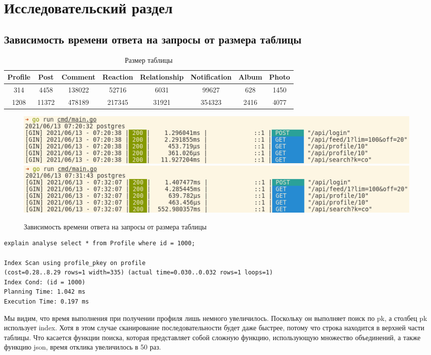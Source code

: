 \chapter{Исследовательский раздел}
\label{cha:research}

\section{Зависимость времени ответа на запросы от размера таблицы}

\setlength\tabcolsep{0.2cm}

\begin{table}[H]
\centering
\begin{tabular}{|c|c|c|c|c|c|c|c|}
    \hline
    Profile & Post & Comment & Reaction & Relationship & Notification & Album & Photo \\
    \hline
    314 & 4458 & 138022 & 52716 & 6031 & 99627 & 628 & 1450 \\
    1208 & 11372 & 478189 & 217345 & 31921 & 354323 & 2416 & 4077 \\
    \hline
\end{tabular}
\caption{Размер таблицы}
\end{table}

\begin{figure}[H]
    \centering
    \includegraphics[width=\textwidth]{img/b1.png}
    \includegraphics[width=\textwidth]{img/b2.png}
    \caption{Зависимость времени ответа на запросы от размера таблицы}
\end{figure}


\begin{verbatim}
explain analyse select * from Profile where id = 1000;

Index Scan using profile_pkey on profile
(cost=0.28..8.29 rows=1 width=335) (actual time=0.030..0.032 rows=1 loops=1)
Index Cond: (id = 1000)
Planning Time: 1.042 ms
Execution Time: 0.197 ms
\end{verbatim}

Мы видим, что время выполнения при получении профиля лишь немного увеличилось. Поскольку он выполняет поиск по pk, а столбец pk использует index. Хотя в этом случае сканирование последовательности будет даже быстрее, потому что строка находится в верхней части таблицы. Что касается функции поиска, которая представляет собой сложную функцию, использующую множество объединений, а также функцию json, время отклика увеличилось в 50 раз.



